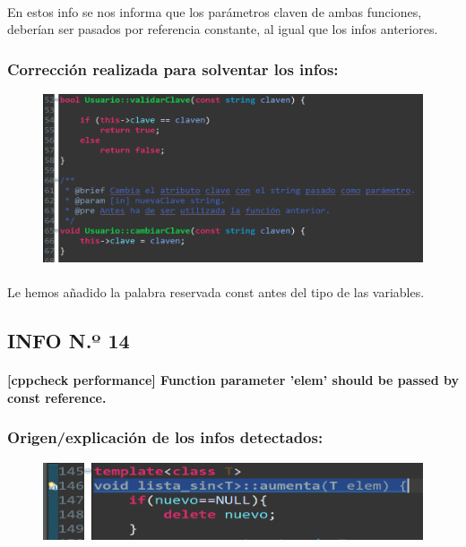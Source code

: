 			\paragraph{}En estos info se nos informa que los parámetros claven de ambas funciones, deberían ser pasados por referencia constante, al igual que los infos anteriores.
			
		\subsubsection{Corrección realizada para solventar los infos:}
		
			\begin{figure}[H]
				\centering
				\includegraphics[scale=0.55]{img/esteban19.png}
				\label{esteban19}
			\end{figure}
		
			\paragraph{}Le hemos añadido la palabra reservada const antes del tipo de las variables.
			
	\subsection{ INFO N.º 14}
	
		\paragraph{[cppcheck performance] Function parameter 'elem' should be passed by const reference.}
	
		\subsubsection{Origen/explicación de los infos detectados:}
		
			\begin{figure}[H]
				\centering
				\includegraphics[scale=0.55]{img/esteban20.png}
				\label{esteban20}
			\end{figure}
		
